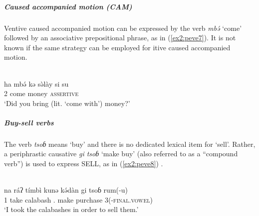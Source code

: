 \subparagraph{Caused accompanied motion (CAM)}

Ventive caused accompanied motion can be expressed by the verb \textit{mbə́} `come' followed by an associative prepositional phrase, as in (\ref{ex2:peve7}). It is not known if the same strategy can be employed for itive caused accompanied motion.

\ea\label{ex2:peve7}
 \\
\gll ha mbə́ kə sə̀lày si su \\
2 come  money \textsc{assertive}  \\
\glt `Did you bring (lit. ‘come with’) money?'
\z 


\subparagraph{Buy-sell verbs}

The verb \textit{tsoɓ} means `buy' and there is no dedicated lexical item for `sell'. Rather, a periphrastic causative \textit{gi tsoɓ} `make buy' (also referred to as a ``compound verb'') is used to express SELL, as in (\ref{ex2:peve8}) \citep[70, 294]{shayGrammarPeve2020}.

\ea\label{ex2:peve8}
 \\
\gll  na ráʔ tímbì kunə kə́dàn gi tsoɓ rum(-u) \\
1 take calabash .  make purchase 3(-\textsc{final.vowel}) \\
\glt `I took the calabashes in order to sell them.'
\z
